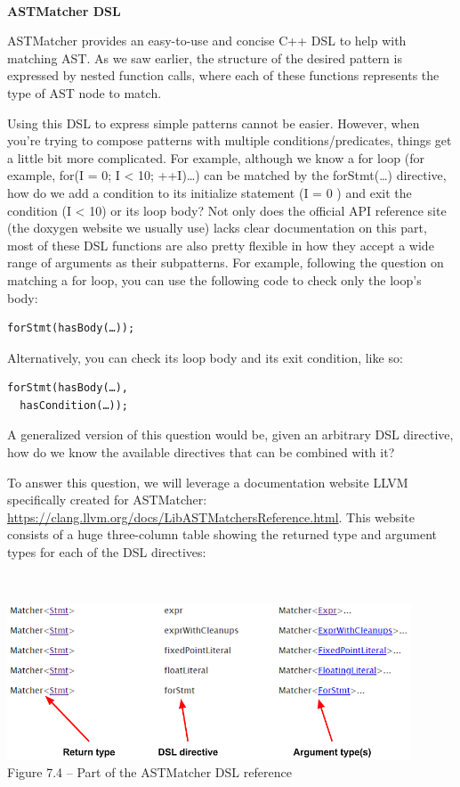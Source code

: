 \hspace*{\fill} \\ %
\noindent
\textbf{ASTMatcher DSL}

ASTMatcher provides an easy-to-use and concise C++ DSL to help with matching AST. As we saw earlier, the structure of the desired pattern is expressed by nested function calls, where each of these functions represents the type of AST node to match.

Using this DSL to express simple patterns cannot be easier. However, when you're trying to compose patterns with multiple conditions/predicates, things get a little bit more complicated. For example, although we know a for loop (for example, for(I = 0; I < 10; ++I){…}) can be matched by the forStmt(…) directive, how do we add a condition to its initialize statement (I = 0 ) and exit the condition (I < 10) or its loop body? Not only does the official API reference site (the doxygen website we usually use) lacks clear documentation on this part, most of these DSL functions are also pretty flexible in how they accept a wide range of arguments as their subpatterns. For example, following the question on matching a for loop, you can use the following code to check only the loop's body:

\begin{lstlisting}[style=styleCXX]
forStmt(hasBody(…));
\end{lstlisting}

Alternatively, you can check its loop body and its exit condition, like so:

\begin{lstlisting}[style=styleCXX]
forStmt(hasBody(…),
  hasCondition(…));
\end{lstlisting}

A generalized version of this question would be, given an arbitrary DSL directive, how do we know the available directives that can be combined with it?

To answer this question, we will leverage a documentation website LLVM specifically created for ASTMatcher: \url{https://clang.llvm.org/docs/LibASTMatchersReference.html}. This website consists of a huge three-column table showing the returned type and argument types for each of the DSL directives:

\hspace*{\fill} \\ %
\begin{center}
\includegraphics[width=0.9\textwidth]{content/2/chapter7/images/4.png}\\
Figure 7.4 – Part of the ASTMatcher DSL reference
\end{center}

